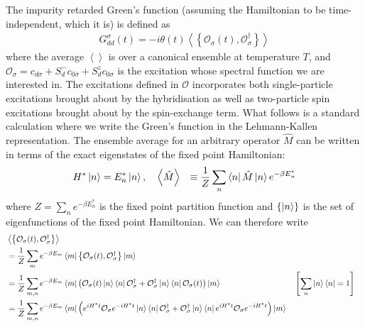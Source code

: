 \documentclass[reprint,hidelinks]{revtex4-2}
\begin{document}
\begin{widetext}
\label{appx-spectral-func}
The impurity retarded Green's function (assuming the Hamiltonian to be time-independent, which it is) is defined as
\begin{equation}\begin{aligned}
	G_{dd}^\sigma(t) = -i\theta(t) \left<\left\{ \mathcal{O}_{\sigma}(t),\mathcal{O}^\dagger_{\sigma} \right\}  \right>
\end{aligned}\end{equation}
where the average \(\left< \right>\) is over a canonical ensemble at temperature \(T\), and \(\mathcal{O}_\sigma = c_{d\sigma} + S_d^- c_{0\overline\sigma} + S_d^z c_{0\sigma}\) is the excitation whose spectral function we are interested in. The excitations defined in \(\mathcal{O}\) incorporates both single-particle excitations brought about by the hybridisation as well as two-particle spin excitations brought about by the spin-exchange term. What follows is a standard calculation where we write the Green's function in the Lehmann-Kallen representation. The ensemble average for an arbitrary operator \(\hat M\) can be written in terms of the exact eigenstates of the fixed point Hamiltonian:
\begin{equation}\begin{aligned}
	H^* \ket{n} &= E_n^* \ket{n}, ~ ~ ~\left<\hat M \right> &\equiv \frac{1}{Z}\sum_n \bra{n} \hat M \ket{n} e^{-\beta E_n^*}
\end{aligned}\end{equation}
where \(Z = \sum_n e^{-\beta E_n^*}\) is the fixed point partition function and \(\left\{ \ket{n} \right\} \) is the set of eigenfunctions of the fixed point Hamiltonian. We can therefore write
\begin{equation}\begin{aligned}
	&\left<\left\{ \mathcal{O}_{\sigma}(t),\mathcal{O}^\dagger_{\sigma} \right\}  \right> \\
	&= \frac{1}{Z}\sum_{m}e^{-\beta E_m}\bra{m}\left\{ \mathcal{O}_{\sigma}(t),\mathcal{O}^\dagger_{\sigma} \right\} \ket{m}\\
	&= \frac{1}{Z}\sum_{m,n}e^{-\beta E_m}\bra{m}\left( \mathcal{O}_{\sigma}(t)\ket{n}\bra{n}\mathcal{O}^\dagger_{\sigma} + \mathcal{O}^\dagger_{\sigma}\ket{n}\bra{n}\mathcal{O}_{\sigma}(t)\right) \ket{m} && \left[\sum_n \ket{n}\bra{n} = 1\right]  \\
	&= \frac{1}{Z}\sum_{m,n}e^{-\beta E_m}\bra{m}\left( e^{iH^* t}\mathcal{O}_{\sigma}e^{-iH^* t}\ket{n}\bra{n}\mathcal{O}^\dagger_{\sigma} + \mathcal{O}^\dagger_{\sigma}\ket{n}\bra{n}e^{iH^* t}\mathcal{O}_{\sigma}e^{-iH^* t}\right) \ket{m}\\

\end{aligned}
\end{equation}
\end{widetext}
\end{document}
